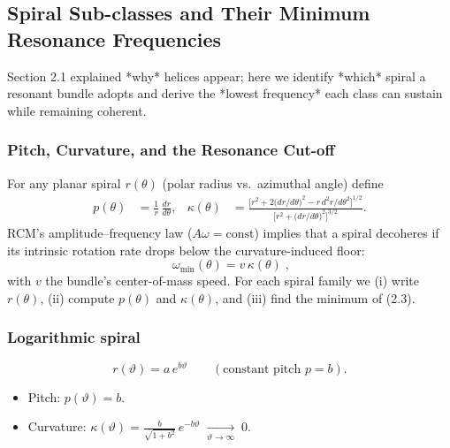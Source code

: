 \subsection{Spiral Sub-classes and Their Minimum Resonance Frequencies}

Section 2.1 explained *why* helices appear; here we identify *which* spiral a resonant bundle adopts and derive the *lowest frequency* each class can sustain while remaining coherent.

\subsubsection{Pitch, Curvature, and the Resonance Cut-off}

For any planar spiral \(r(\theta)\) (polar radius vs.\ azimuthal angle) define
\begin{align}
  p(\theta)
  &= \frac{1}{r}\,\frac{dr}{d\theta},
  &
  \kappa(\theta)
  &= \frac{\bigl[r^{2} + 2\bigl(dr/d\theta\bigr)^{2} - r\,d^{2}r/d\theta^{2}\bigr]^{1/2}}
           {\bigl[r^{2} + \bigl(dr/d\theta\bigr)^{2}\bigr]^{3/2}}.
\end{align}
RCM’s amplitude–frequency law (\(A\omega=\mathrm{const}\)) implies that a spiral decoheres if its intrinsic rotation rate drops below the curvature-induced floor:
\begin{equation}
  \boxed{\;\omega_{\min}(\theta)=v\,\kappa(\theta)\;},
  \tag{2.3}
\end{equation}
with \(v\) the bundle’s center-of-mass speed.  For each spiral family we (i) write \(r(\theta)\), (ii) compute \(p(\theta)\) and \(\kappa(\theta)\), and (iii) find the minimum of (2.3).

\subsubsection*{Logarithmic spiral}

\begin{equation}
  r(\vartheta) = a\,e^{b\vartheta} \qquad (\text{constant pitch } p=b).
\end{equation}

\begin{itemize}[leftmargin=1.5em]
  \item Pitch: \(p(\vartheta)=b\).
  \item Curvature: \(\displaystyle \kappa(\vartheta)
           = \frac{b}{\sqrt{1+b^{2}}}\,e^{-b\vartheta}
           \;\xrightarrow[\vartheta\to\infty]{}\;0.\)
\end{itemize}

